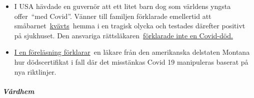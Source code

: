 \begin{itemize}
{  dokument} om behandling av Covid19-patienter förklarar överläkaren för
  pneumologi och intensivvårdmedicin vid Eastern Virginia Medical
  School: ``Covid19 orsakar inte typiskt lungfel \ldots{} Denna sjukdom
  måste behandlas annorlunda och det är troligt att situationen i
  lungorna förvärras av skador förorsakad av konstgjord andning.''
\item
  I USA hävdade en guvernör att ett litet barn dog som världens yngsta
  offer~``med Covid''. Vänner till familjen förklarade emellertid att
  småbarnet~\href{https://www.washingtonexaminer.com/news/candace-owens-accuses-connecticut-governor-of-lying-about-coronavirus-death-calls-for-resignation}{kvävts}~hemma
  i en tragisk olycka och testades därefter positivt på sjukhuset. Den
  ansvariga
  rättsläkaren~\href{https://www.dailymail.co.uk/news/article-8193487/Coroner-refuses-rule-COVID-19-cause-death-six-week-old-Connecticut-baby.html}{förklarade
  inte en Covid-död.}
\item
  \href{https://www.youtube.com/watch?v=V0lIWZpiRU0}{I en föreläsning
  förklarar}~en läkare från den amerikanska delstaten Montana hur
  dödscertifikat i fall där det misstänkas Covid 19 manipuleras baserat
  på nya riktlinjer.
\end{itemize}

\hypertarget{vuxe5rdhem}{%
\subparagraph{\texorpdfstring{\textbf{Vårdhem}}{Vårdhem}}\label{vuxe5rdhem}}

